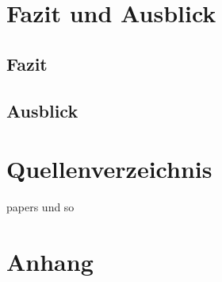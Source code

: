 \documentclass[12pt,a4paper]{report}
\begin{document}
\newpage
\chapter{Fazit und Ausblick}
\section{Fazit}

\newpage
\section{Ausblick}
\newpage
\chapter*{Quellenverzeichnis}


\nocite{rehurek_lrec}
papers und so
\listoftables
\listoffigures 




\chapter{Anhang}
\end{document}
